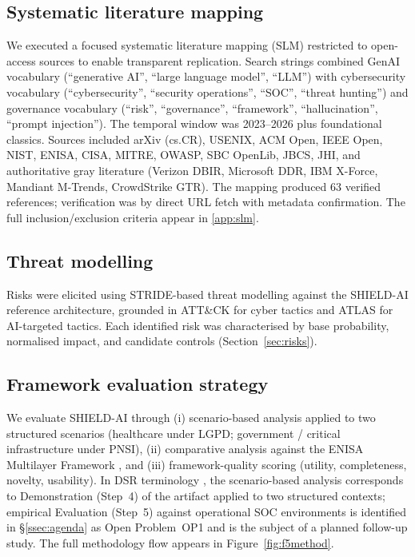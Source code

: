\documentclass[preprint,12pt,authoryear]{elsarticle}
\begin{document}
\subsection{Systematic literature mapping}
We executed a focused systematic literature mapping (SLM) restricted to open-access sources to enable transparent replication. Search strings combined GenAI vocabulary (``generative AI'', ``large language model'', ``LLM'') with cybersecurity vocabulary (``cybersecurity'', ``security operations'', ``SOC'', ``threat hunting'') and governance vocabulary (``risk'', ``governance'', ``framework'', ``hallucination'', ``prompt injection''). The temporal window was 2023--2026 plus foundational classics. Sources included arXiv (cs.CR), USENIX, ACM Open, IEEE Open, NIST, ENISA, CISA, MITRE, OWASP, SBC OpenLib, JBCS, JHI, and authoritative gray literature (Verizon DBIR, Microsoft DDR, IBM X-Force, Mandiant M-Trends, CrowdStrike GTR). The mapping produced 63 verified references; verification was by direct URL fetch with metadata confirmation. The full inclusion/exclusion criteria appear in \ref{app:slm}.

\subsection{Threat modelling}
Risks were elicited using STRIDE-based threat modelling against the SHIELD-AI reference architecture, grounded in ATT\&CK \citep{mitre2024attck} for cyber tactics and ATLAS \citep{mitre2025atlas} for AI-targeted tactics. Each identified risk was characterised by base probability, normalised impact, and candidate controls (Section~\ref{sec:risks}).

\subsection{Framework evaluation strategy}
We evaluate SHIELD-AI through (i) scenario-based analysis applied to two structured scenarios (healthcare under LGPD; government / critical infrastructure under PNSI), (ii) comparative analysis against the ENISA Multilayer Framework \citep{enisa2023multilayer}, and (iii) framework-quality scoring (utility, completeness, novelty, usability). In DSR terminology \citep{peffers2007dsrm}, the scenario-based analysis corresponds to Demonstration (Step~4) of the artifact applied to two structured contexts; empirical Evaluation (Step~5) against operational SOC environments is identified in §\ref{ssec:agenda} as Open Problem~OP1 and is the subject of a planned follow-up study. The full methodology flow appears in Figure~\ref{fig:f5method}.
\end{document}
